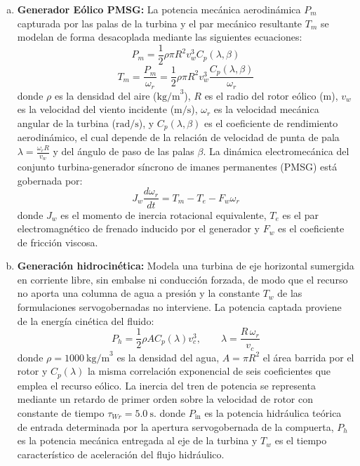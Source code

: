 \begin{enumerate}[a)]
    \item \textbf{Generador Eólico PMSG:} La potencia mecánica aerodinámica $P_m$ capturada por las palas de la turbina y el par mecánico resultante $T_m$ se modelan de forma desacoplada mediante las siguientes ecuaciones:
    \begin{equation}
    P_m = \frac{1}{2} \rho \pi R^2 v_w^3 C_p(\lambda, \beta)
    \end{equation}
    \begin{equation}
    T_m = \frac{P_m}{\omega_r} = \frac{1}{2} \rho \pi R^2 v_w^3 \frac{C_p(\lambda, \beta)}{\omega_r}
    \end{equation}
    donde $\rho$ es la densidad del aire ($\text{kg/m}^3$), $R$ es el radio del rotor eólico ($\text{m}$), $v_w$ es la velocidad del viento incidente ($\text{m/s}$), $\omega_r$ es la velocidad mecánica angular de la turbina ($\text{rad/s}$), y $C_p(\lambda, \beta)$ es el coeficiente de rendimiento aerodinámico, el cual depende de la relación de velocidad de punta de pala $\lambda = \frac{\omega_r R}{v_w}$ y del ángulo de paso de las palas $\beta$. La dinámica electromecánica del conjunto turbina-generador síncrono de imanes permanentes (PMSG) está gobernada por:
    \begin{equation}\label{eq:pmsg_swing}
    J_w \frac{d\omega_r}{dt} = T_m - T_e - F_w \omega_r
    \end{equation}
    donde $J_w$ es el momento de inercia rotacional equivalente, $T_e$ es el par electromagnético de frenado inducido por el generador y $F_w$ es el coeficiente de fricción viscosa.
    
    \item \textbf{Generación hidrocinética:} Modela una turbina de eje horizontal sumergida en corriente libre, sin embalse ni conducción forzada, de modo que el recurso no aporta una columna de agua a presión y la constante $T_w$ de las formulaciones servogobernadas no interviene. La potencia captada proviene de la energía cinética del fluido:
    \begin{equation}\label{eq:hydro_power}
    P_h = \frac{1}{2}\rho A C_p(\lambda) v_c^3, \qquad \lambda = \frac{R\,\omega_r}{v_c}
    \end{equation}
    donde $\rho = 1000\ \text{kg/m}^3$ es la densidad del agua, $A = \pi R^2$ el área barrida por el rotor y $C_p(\lambda)$ la misma correlación exponencial de seis coeficientes que emplea el recurso eólico. La inercia del tren de potencia se representa mediante un retardo de primer orden sobre la velocidad de rotor con constante de tiempo $\tau_{Wr} = 5.0\ \text{s}$.
    donde $P_{\text{in}}$ es la potencia hidráulica teórica de entrada determinada por la apertura servogobernada de la compuerta, $P_h$ es la potencia mecánica entregada al eje de la turbina y $T_w$ es el tiempo característico de aceleración del flujo hidráulico.
    

\end{enumerate}
